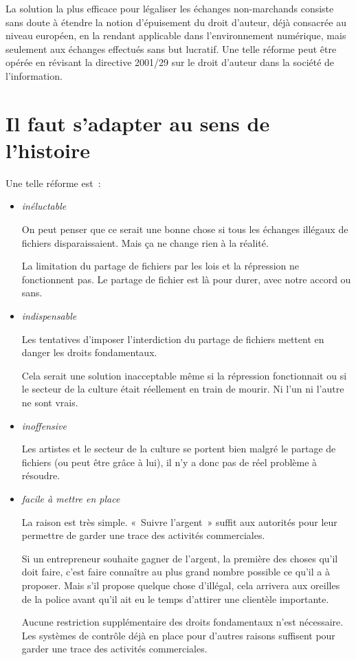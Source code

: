 La solution la plus efficace pour légaliser les échanges non-marchands consiste sans doute à étendre la notion d'épuisement du droit d'auteur, déjà consacrée au niveau européen, en la rendant applicable dans l'environnement numérique, mais seulement aux échanges effectués sans but lucratif. Une telle réforme peut être opérée en révisant la directive 2001/29 sur le droit d'auteur dans la société de l'information.  

\section{Il faut s'adapter au sens de l'histoire}

Une telle réforme est~:

\begin{itemize}
 \item \emph{inéluctable}
 
On peut penser que ce serait une bonne chose si tous les échanges illégaux de fichiers
disparaissaient. Mais ça
ne change rien à la réalité. 

La limitation du partage de fichiers par les lois et la répression ne
fonctionnent pas. Le partage de fichier est là pour durer, avec notre accord ou sans.
\item \emph{indispensable}

Les tentatives d’imposer
l’interdiction du partage de fichiers mettent en danger les droits fondamentaux.

Cela serait une solution inacceptable même si la répression fonctionnait ou si le secteur de la culture était réellement en train de mourir. Ni l'un ni l'autre ne sont vrais.
\item \emph{inoffensive}

Les artistes et le secteur de la
culture se portent bien malgré le partage de fichiers (ou peut être grâce à
lui), il n’y a donc pas de réel problème à résoudre.

\item \emph{facile à mettre en place}

La raison est très simple. «~Suivre l’argent~» suffit aux autorités pour leur permettre de garder une trace des activités
commerciales.

Si un entrepreneur souhaite gagner de l’argent, la première des choses qu’il doit faire, c’est faire connaître au plus grand nombre possible ce qu’il a à proposer. Mais s'il propose quelque
chose d’illégal, cela arrivera aux oreilles de la police avant qu’il ait eu le temps d’attirer une
clientèle importante.

Aucune restriction supplémentaire des droits fondamentaux n’est nécessaire. Les systèmes de contrôle
déjà en place pour d’autres raisons suffisent pour garder une trace des activités commerciales.

\end{itemize}

